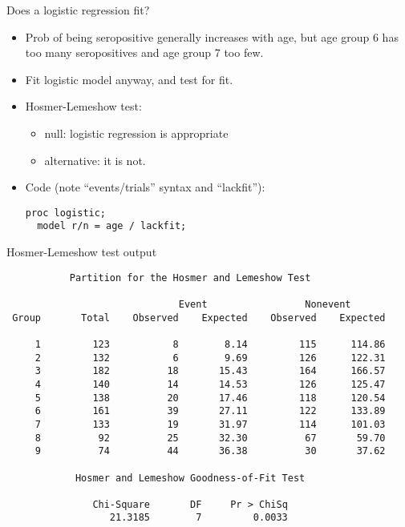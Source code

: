 \documentclass[pdf]{prosper}
\begin{document}
\begin{slide}{Does a logistic regression fit?}

  \begin{itemize}
  \item 
Prob of being seropositive generally increases with age, but age group 6 has too many seropositives and age group 7 too few. 
\item Fit logistic model anyway, and test for fit.
\item Hosmer-Lemeshow test: 
  \begin{itemize}
  \item null: logistic regression is appropriate
  \item alternative: it is not.
  \end{itemize}
\item Code (note ``events/trials'' syntax and ``lackfit''):

\begin{verbatim}
proc logistic;
  model r/n = age / lackfit;
\end{verbatim}
  \end{itemize}
\end{slide}

\begin{slide}{Hosmer-Lemeshow test output}

{\scriptsize
\begin{verbatim}
           Partition for the Hosmer and Lemeshow Test

                              Event                 Nonevent
 Group       Total    Observed    Expected    Observed    Expected

     1         123           8        8.14         115      114.86
     2         132           6        9.69         126      122.31
     3         182          18       15.43         164      166.57
     4         140          14       14.53         126      125.47
     5         138          20       17.46         118      120.54
     6         161          39       27.11         122      133.89
     7         133          19       31.97         114      101.03
     8          92          25       32.30          67       59.70
     9          74          44       36.38          30       37.62

            Hosmer and Lemeshow Goodness-of-Fit Test

               Chi-Square       DF     Pr > ChiSq
                  21.3185        7         0.0033

\end{verbatim}
}

\end{slide}
\end{document}

